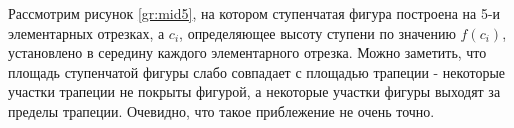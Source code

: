 \documentclass[12pt, a4paper]{article}
\begin{document}
Рассмотрим рисунок \ref{gr:mid5}, на котором ступенчатая фигура построена на 5-и элементарных отрезках, а $c_i$, определяющее высоту ступени по значению $f(c_i)$, установлено в середину каждого элементарного отрезка. Можно заметить, что площадь ступенчатой фигуры слабо совпадает с площадью трапеции - некоторые участки трапеции не покрыты фигурой, а некоторые участки фигуры выходят за пределы трапеции. Очевидно, что такое приблежение не очень точно.


\newcommand{\stair}[2]{
\addplot [
        thick,
        color=\scolor,
        fill=\scolor, 
        fill opacity=0.5,
        domain =\st + #1*\sz:\st + (#1+1)*\sz,
        name path = p#1
    ]{#2};
\node[circle, \scolor, fill, inner sep=1pt, thick] at (\st + #1*\sz, 0){};
\node[circle, \scolor, fill, inner sep=1pt, thick] at (\st + (#1*\sz + 1*\sz, 0){};
\draw [dotted, \scolor,  thick] (\st + #1*\sz + \sz*\npos, 0) node[rectangle, fill, inner sep=1.5pt]{} -- (\st + #1*\sz + \sz*\npos, #2) node[rectangle, fill, inner sep=1.5pt]{};

\path[name path = axis#1] (\st + #1*\sz , 0) -- (\st + #1*\sz + 1*\sz , 0);
\addplot [
        thick,
        color=\scolor,
        fill=\scolor, 
        fill opacity=0.2
    ]
    fill between[
        of=p#1 and axis#1,
        soft clip={domain=\st+#1*\sz:\st + #1*\sz+1*\sz},
    ];
}
\end{document}
